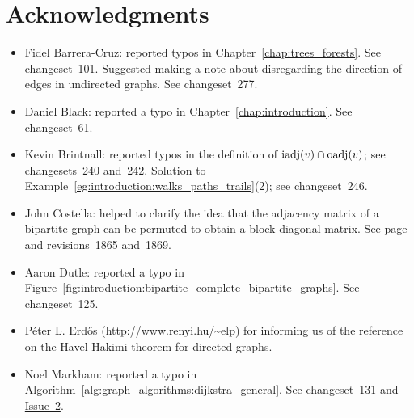 
\chapter{Acknowledgments}

\begin{itemize}
\item Fidel Barrera-Cruz: reported typos in
  Chapter~\ref{chap:trees_forests}. See changeset~101. Suggested
  making a note about disregarding the direction of edges in
  undirected graphs. See changeset~277.

\item Daniel Black: reported a typo in
  Chapter~\ref{chap:introduction}. See changeset~61.

\item Kevin Brintnall: reported typos in the definition of
  $\operatorname*{iadj}(v) \cap \operatorname*{oadj}(v)$; see changesets~240 and~242. Solution to
  Example~\ref{eg:introduction:walks_paths_trails}(2); see changeset~246.

\item John Costella: helped to clarify the idea that the adjacency
  matrix of a bipartite graph can be permuted to obtain a block
  diagonal matrix. See page~\pageref{sec:introduction:bipartite_case}
  and revisions~1865 and~1869.

\item Aaron Dutle: reported a typo in
  Figure~\ref{fig:introduction:bipartite_complete_bipartite_graphs}. See
  changeset~125.

\item P\'eter L. Erd\H{o}s (\url{http://www.renyi.hu/~elp}) for informing
  us of the reference~\cite{ErdosEtAl2010} on the Havel-Hakimi
  theorem for directed graphs.

\item Noel Markham: reported a typo in
  Algorithm~\ref{alg:graph_algorithms:dijkstra_general}. See
  changeset~131 and
  \href{http://code.google.com/p/graph-theory-algorithms-book/issues/detail?id=2}{Issue~2}.


\end{itemize}
